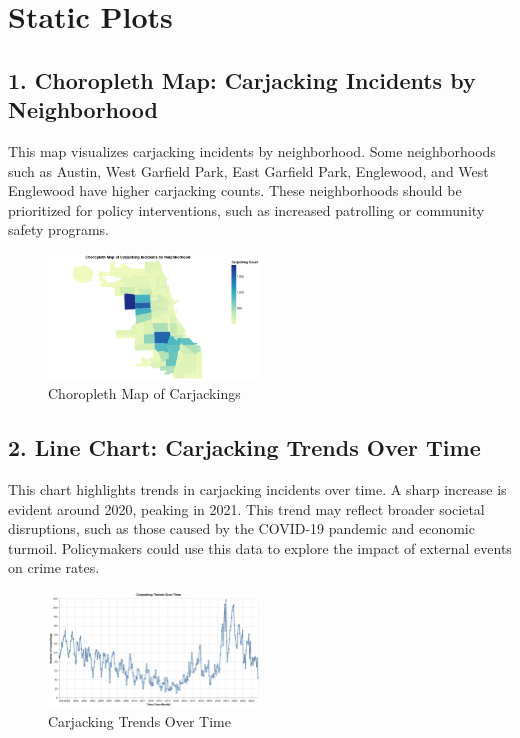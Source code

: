 \documentclass[
  9pt,
  letterpaper,
  DIV=11,
  numbers=noendperiod]{scrartcl}
\begin{document}
\section{Static Plots}\label{static-plots}

\subsection{1. Choropleth Map: Carjacking Incidents by
Neighborhood}\label{choropleth-map-carjacking-incidents-by-neighborhood}

This map visualizes carjacking incidents by neighborhood. Some
neighborhoods such as Austin, West Garfield Park, East Garfield Park,
Englewood, and West Englewood have higher carjacking counts. These
neighborhoods should be prioritized for policy interventions, such as
increased patrolling or community safety programs.

\begin{figure}[H]

{\centering \includegraphics[width=0.5\textwidth,height=\textheight]{pictures/choropleth_map.png}

}

\caption{Choropleth Map of Carjackings}

\end{figure}%

\subsection{2. Line Chart: Carjacking Trends Over
Time}\label{line-chart-carjacking-trends-over-time}

This chart highlights trends in carjacking incidents over time. A sharp
increase is evident around 2020, peaking in 2021. This trend may reflect
broader societal disruptions, such as those caused by the COVID-19
pandemic and economic turmoil. Policymakers could use this data to
explore the impact of external events on crime rates.

\begin{figure}[H]

{\centering \includegraphics[width=0.5\textwidth,height=\textheight]{pictures/line_chart.png}

}

\caption{Carjacking Trends Over Time}

\end{figure}%
\end{document}
